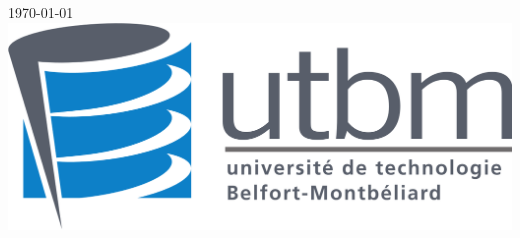 \documentclass[a4paper, sans]{article}
\begin{document}
\begin{titlepage}
      {\large \today}\\[2cm] %
      
      
      \includegraphics[scale=0.18]{img/utbm_logo.png}\\[1cm] %
      
      
      \vfill %
      
    \end{titlepage}
    \thispagestyle{empty}

    \clearpage

    {\hypersetup{linkcolor=black}
    \tableofcontents }

    \newpage

\end{document}

